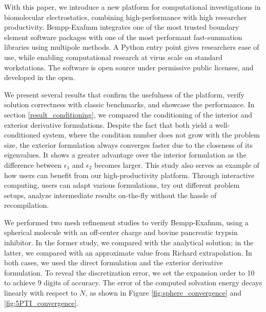 With this paper, we introduce a new platform for computational investigations in biomolecular electrostatics, combining high-performance with high researcher productivity. 
Bempp-Exafmm integrates one of the most trusted boundary element software packages with one of the most performant fast-summation libraries using multipole methods. 
A Python entry point gives researchers ease of use, while enabling computational research at virus scale on standard workstations.
The software is open source under permissive public licenses, and developed in the open.

We present several results that confirm the usefulness of the platform, verify solution correctness with classic benchmarks, and showcase the performance. 
In section \ref{result_conditioning}, we compared the conditioning of the interior and exterior derivative formulations.
Despite the fact that both yield a well-conditioned system, where the condition number does not grow with the problem size, the exterior formulation always converges faster due to the closeness of its eigenvalues.
It shows a greater advantage over the interior formulation as the difference between $\epsilon_1$ and $\epsilon_2$ becomes larger.
This study also serves as example of how users can benefit from our high-productivity platform.
Through interactive computing, users can adapt various formulations, try out different problem setups, analyze intermediate results on-the-fly without the hassle of recompilation.

We performed two mesh refinement studies to verify Bempp-Exafmm, using a spherical molecule with an off-center charge and bovine pancreatic trypsin inhibitor.
In the former study, we compared with the analytical solution; in the latter, we compared with an approximate value from Richard extrapolation.
In both cases, we used the direct formulation and the exterior derivative formulation.
To reveal the discretization error, we set the \fmm expansion order to 10 to achieve 9 digits of accuracy.
The error of the computed solvation energy decays linearly with respect to $N$, as shown in Figure \ref{fig:sphere_convergence} and \ref{fig:5PTI_convergence}.

